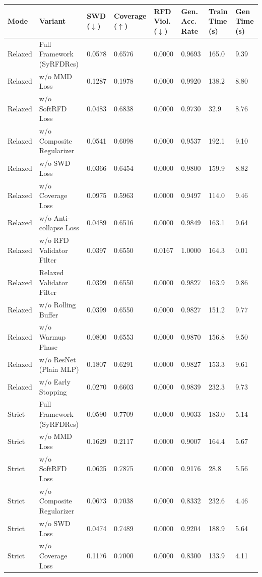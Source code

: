 \begin{tabular}{llllllll}
\toprule
Mode & Variant & SWD ($\downarrow$) & Coverage ($\uparrow$) & RFD Viol. ($\downarrow$) & Gen. Acc. Rate & Train Time (s) & Gen Time (s) \\
\midrule
Relaxed & Full Framework (SyRFDRes) & 0.0578 & 0.6576 & 0.0000 & 0.9693 & 165.0 & 9.39 \\
Relaxed & w/o MMD Loss & 0.1287 & 0.1978 & 0.0000 & 0.9920 & 138.2 & 8.80 \\
Relaxed & w/o SoftRFD Loss & 0.0483 & 0.6838 & 0.0000 & 0.9730 & 32.9 & 8.76 \\
Relaxed & w/o Composite Regularizer & 0.0541 & 0.6098 & 0.0000 & 0.9537 & 192.1 & 9.10 \\
Relaxed & w/o SWD Loss & 0.0366 & 0.6454 & 0.0000 & 0.9800 & 159.9 & 8.82 \\
Relaxed & w/o Coverage Loss & 0.0975 & 0.5963 & 0.0000 & 0.9497 & 114.0 & 9.46 \\
Relaxed & w/o Anti-collapse Loss & 0.0489 & 0.6516 & 0.0000 & 0.9849 & 163.1 & 9.64 \\
Relaxed & w/o RFD Validator Filter & 0.0397 & 0.6550 & 0.0167 & 1.0000 & 164.3 & 0.01 \\
Relaxed & Relaxed Validator Filter & 0.0399 & 0.6550 & 0.0000 & 0.9827 & 163.9 & 9.86 \\
Relaxed & w/o Rolling Buffer & 0.0399 & 0.6550 & 0.0000 & 0.9827 & 151.2 & 9.77 \\
Relaxed & w/o Warmup Phase & 0.0800 & 0.6553 & 0.0000 & 0.9870 & 156.8 & 9.50 \\
Relaxed & w/o ResNet (Plain MLP) & 0.1807 & 0.6291 & 0.0000 & 0.9827 & 153.3 & 9.61 \\
Relaxed & w/o Early Stopping & 0.0270 & 0.6603 & 0.0000 & 0.9839 & 232.3 & 9.73 \\
Strict & Full Framework (SyRFDRes) & 0.0590 & 0.7709 & 0.0000 & 0.9033 & 183.0 & 5.14 \\
Strict & w/o MMD Loss & 0.1629 & 0.2117 & 0.0000 & 0.9007 & 164.4 & 5.67 \\
Strict & w/o SoftRFD Loss & 0.0625 & 0.7875 & 0.0000 & 0.9176 & 28.8 & 5.56 \\
Strict & w/o Composite Regularizer & 0.0673 & 0.7038 & 0.0000 & 0.8332 & 232.6 & 4.46 \\
Strict & w/o SWD Loss & 0.0474 & 0.7489 & 0.0000 & 0.9204 & 188.9 & 5.64 \\
Strict & w/o Coverage Loss & 0.1176 & 0.7000 & 0.0000 & 0.8300 & 133.9 & 4.11 \\

\end{tabular}
